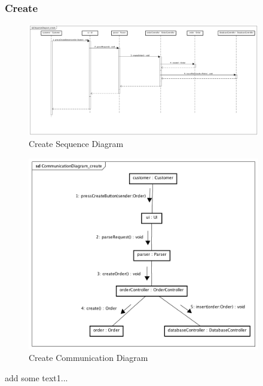 \documentclass[12pt]{scrreprt}
\begin{document}
\subsubsection{Create}
\begin{figure}[H]
  \centering\includegraphics[width=4in]{DocumentRes/1SequenceDiagram_create.png}
  \caption{Create Sequence Diagram}
\end{figure}
\begin{figure}[H]
  \centering\includegraphics[width=4in]{DocumentRes/1CommunicationDiagram_create.png}
  \caption{Create Communication Diagram}
\end{figure}
add some text1...
\end{document}
